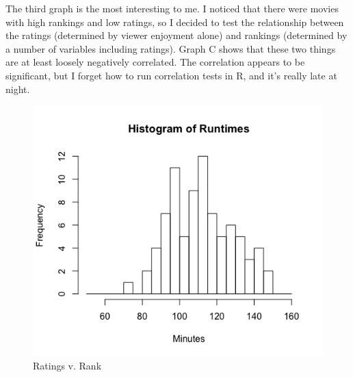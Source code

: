 \documentclass{article}
\begin{document}
The third graph is the most interesting to me. I noticed that there were movies with high rankings and low ratings, so I decided to test the relationship between the ratings (determined by viewer enjoyment alone) and rankings (determined by a number of variables including ratings). Graph C shows that these two things are at least loosely negatively correlated. The correlation appears to be significant, but I forget how to run correlation tests in R, and it's really late at night.

\begin{figure}[h!]
\centering
\includegraphics[scale=.5]{PS6c_Holt}
\caption{Ratings v. Rank}
\label{fig:PS6c_Holt}
\end{figure}
\end{document}
